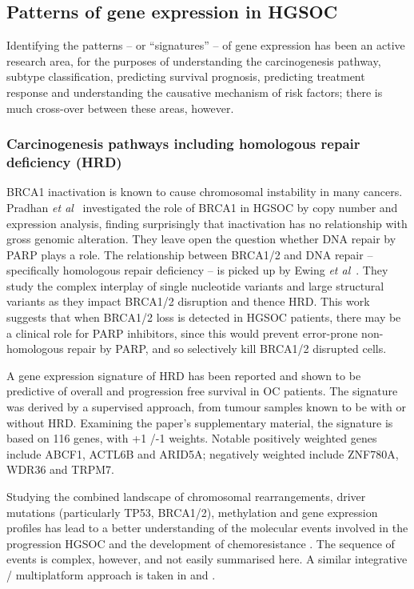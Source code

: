 \documentclass[tikz, 12pt,a4paper,oneside,fleqn]{article}
\newcommand{\etal}{{\em et al\/}}
\begin{document}
\subsection{Patterns of gene expression in HGSOC}
\label{sec-review-of-gene-expression}
Identifying the patterns -- or ``signatures'' -- of gene expression has been an active research area, for the purposes of understanding the carcinogenesis pathway, subtype classification, predicting survival prognosis, predicting treatment response and understanding the causative mechanism of risk factors; there is much cross-over between these areas, however.

\subsubsection{Carcinogenesis pathways including homologous repair deficiency (HRD)}

BRCA1 inactivation is known to cause chromosomal instability in many cancers.  Pradhan \etal\ \cite{Pradhan2010} investigated the role of BRCA1 in HGSOC by copy number and expression analysis, finding surprisingly that inactivation has no relationship with gross genomic alteration.  They leave open the question whether DNA repair by PARP plays a role.   The relationship between BRCA1/2 and DNA repair -- specifically homologous repair deficiency -- is picked up by Ewing \etal\ \cite{Ewing2020}.  They study the complex interplay of single nucleotide variants and large structural variants as they impact BRCA1/2 disruption and thence HRD.  This work suggests that when BRCA1/2 loss is detected in HGSOC patients, there may be a clinical role for PARP inhibitors, since this would prevent error-prone non-homologous repair by PARP, and so selectively kill BRCA1/2 disrupted cells.  

A gene expression signature of HRD has been reported \cite{Lu2014} and shown to be predictive of overall and progression free survival in OC patients.  The signature was derived by a supervised approach, from tumour samples known to be with or without HRD.  Examining the paper's supplementary material, the signature is based on 116 genes, with +1 /-1 weights.  Notable positively weighted genes include ABCF1, ACTL6B and ARID5A; negatively weighted include ZNF780A, WDR36 and TRPM7.

Studying the combined landscape of chromosomal rearrangements, driver mutations (particularly TP53, BRCA1/2), methylation and gene expression profiles has lead to a better understanding of the molecular events involved in the progression HGSOC and the development of chemoresistance \cite{Patch2015}.  The sequence of events is complex, however, and not easily summarised here.   A similar integrative / multiplatform approach is taken in \cite{He2017a} and \cite{Hoadley2014}.  
\end{document}
